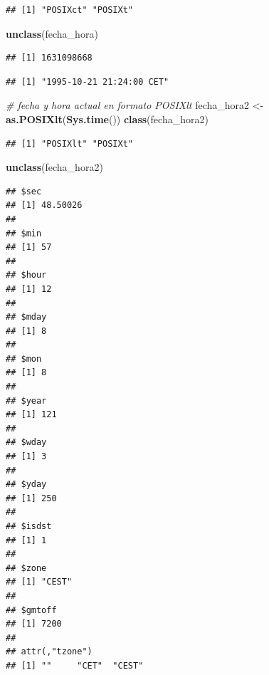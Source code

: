 \documentclass[11pt,]{book}
\newenvironment{Shaded}{\begin{snugshade}}{\end{snugshade}}
\newcommand{\CommentTok}[1]{\textcolor[rgb]{0.37,0.37,0.37}{\textit{#1}}}
\newcommand{\KeywordTok}[1]{\textcolor[rgb]{0.27,0.27,0.27}{\textbf{#1}}}
\newcommand{\NormalTok}[1]{#1}
\newcommand{\StringTok}[1]{\textcolor[rgb]{0.5,0.5,0.5}{#1}}
\begin{document}
\begin{verbatim}
## [1] "POSIXct" "POSIXt"
\end{verbatim}

\begin{Shaded}
\begin{Highlighting}[]
\KeywordTok{unclass}\NormalTok{(fecha_hora)}
\end{Highlighting}
\end{Shaded}

\begin{verbatim}
## [1] 1631098668
\end{verbatim}

\begin{Shaded}
\end{Shaded}

\begin{verbatim}
## [1] "1995-10-21 21:24:00 CET"
\end{verbatim}

\begin{Shaded}
\begin{Highlighting}[]
\CommentTok{# fecha y hora actual en formato POSIXlt}
\NormalTok{fecha_hora2 <-}\StringTok{ }\KeywordTok{as.POSIXlt}\NormalTok{(}\KeywordTok{Sys.time}\NormalTok{())}
\KeywordTok{class}\NormalTok{(fecha_hora2)}
\end{Highlighting}
\end{Shaded}

\begin{verbatim}
## [1] "POSIXlt" "POSIXt"
\end{verbatim}

\begin{Shaded}
\begin{Highlighting}[]
\KeywordTok{unclass}\NormalTok{(fecha_hora2)}
\end{Highlighting}
\end{Shaded}

\begin{verbatim}
## $sec
## [1] 48.50026
## 
## $min
## [1] 57
## 
## $hour
## [1] 12
## 
## $mday
## [1] 8
## 
## $mon
## [1] 8
## 
## $year
## [1] 121
## 
## $wday
## [1] 3
## 
## $yday
## [1] 250
## 
## $isdst
## [1] 1
## 
## $zone
## [1] "CEST"
## 
## $gmtoff
## [1] 7200
## 
## attr(,"tzone")
## [1] ""     "CET"  "CEST"
\end{verbatim}
\end{document}
